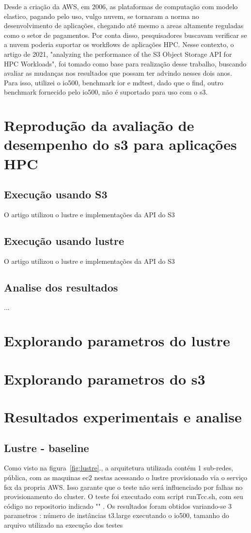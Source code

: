 \documentclass[article,a4paper,12pt,brazil,sumario=tradicional]{abntex2}
\begin{document}
Desde a criação da AWS, em 2006, as plataformas de computação com modelo elastico, pagando pelo uso, vulgo nuvem, se tornaram a norma no desenvolvimento de aplicações, chegando até mesmo a areas altamente reguladas como o setor de pagamentos. Por conta disso, pesquisadores buscavam verificar se a nuvem poderia suportar os workflows de aplicações HPC. Nesse contexto, o artigo de 2021, "analyzing the performance of the S3 Object Storage API for HPC Workloads", foi tomado como base para realização desse trabalho, buscando avaliar as mudanças nos resultados que possam ter advindo nesses dois anos. Para isso, utilizei o io500, benchmark ior e mdtest, dado que o find, outro benchmark fornecido pelo io500, não é suportado para uso com o s3. 

\section{Reprodução da avaliação de desempenho do s3 para aplicações HPC}
\subsection{Execução usando S3}
O artigo utilizou o lustre e implementações da API do S3 
\subsection{Execução usando lustre}
O artigo utilizou o lustre e implementações da API do S3 
\subsection{Analise dos resultados}
...
\section{Explorando parametros do lustre}
\section{Explorando parametros do s3}
\section{Resultados experimentais e analise}


\subsection{Lustre - baseline}
Como visto na figura~\ref{fig:lustre}., a arquitetura utilizada contém 1 sub-redes, pública, com as maquinas ec2 nestas acessando o lustre provisionado via o serviço fsx da propria AWS. Isso garante que o teste não será influenciado por falhas no provisionamento do cluster. O teste foi executado com script runTcc.sh, com seu código no repositorio indicado "" . Os resultados foram obtidos variando-se 3 parametros : número de instâncias t3.large executando o io500, tamanho do arquivo utilizado na execução dos testes
\end{document}
